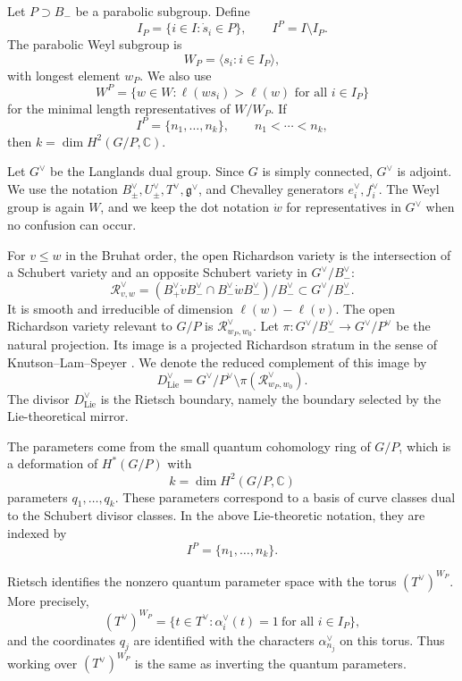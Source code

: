 \documentclass{article}
\newcommand{\CC}{\mathbb{C}}
\begin{document}
Let \(P\supset B_-\) be a parabolic subgroup. Define
\[
I_P=\{i\in I:\dot s_i\in P\},
\qquad
I^P=I\setminus I_P.
\]
The parabolic Weyl subgroup is
\[
W_P=\langle s_i:i\in I_P\rangle,
\]
with longest element \(w_P\). We also use
\[
W^P=\{w\in W:\ell(ws_i)>\ell(w)\text{ for all }i\in I_P\}
\]
for the minimal length representatives of \(W/W_P\). If
\[
I^P=\{n_1,\ldots,n_k\},
\qquad
n_1<\cdots<n_k,
\]
then \(k=\dim H^2(G/P,\CC)\).

Let \(G^\vee\) be the Langlands dual group. Since \(G\) is simply connected, \(G^\vee\) is adjoint. We use the notation \(B_\pm^\vee,U_\pm^\vee,T^\vee,\mathfrak g^\vee\), and Chevalley generators \(e_i^\vee,f_i^\vee\). The Weyl group is again \(W\), and we keep the dot notation \(\dot w\) for representatives in \(G^\vee\) when no confusion can occur.

For \(v\leq w\) in the Bruhat order, the open Richardson variety is the intersection of a Schubert variety and an opposite Schubert variety in \(G^\vee/B_-^\vee\):
\[
\mathcal R_{v,w}^\vee
=
\left(B_+^\vee\dot vB_-^\vee\cap B_-^\vee\dot wB_-^\vee\right)/B_-^\vee
\subset G^\vee/B_-^\vee .
\]
It is smooth and irreducible of dimension \(\ell(w)-\ell(v)\). The open Richardson variety relevant to \(G/P\) is \(\mathcal R_{w_P,w_0}^\vee\). Let \(\pi:G^\vee/B_-^\vee\to G^\vee/P^\vee\) be the natural projection. Its image is a projected Richardson stratum in the sense of Knutson--Lam--Speyer \cite{KLS}. We denote the reduced complement of this image by
\[
D_{\mathrm{Lie}}^\vee=G^\vee/P^\vee\setminus \pi(\mathcal R_{w_P,w_0}^\vee).
\]
The divisor \(D_{\mathrm{Lie}}^\vee\) is the Rietsch boundary, namely the boundary selected by the Lie-theoretical mirror.

The parameters come from the small quantum cohomology ring of \(G/P\), which is a deformation of \(H^*(G/P)\) with
\[
k=\dim H^2(G/P,\CC)
\]
parameters \(q_1,\ldots,q_k\). These parameters correspond to a basis of curve classes dual to the Schubert divisor classes. In the above Lie-theoretic notation, they are indexed by
\[
I^P=\{n_1,\ldots,n_k\}.
\]

Rietsch identifies the nonzero quantum parameter space with the torus \((T^\vee)^{W_P}\). More precisely,
\[
(T^\vee)^{W_P}=\{t\in T^\vee:\alpha_i^\vee(t)=1\ \text{for all }i\in I_P\},
\]
and the coordinates \(q_j\) are identified with the characters \(\alpha_{n_j}^\vee\) on this torus. Thus working over \((T^\vee)^{W_P}\) is the same as inverting the quantum parameters.

\end{document}
